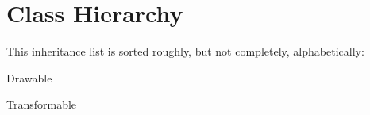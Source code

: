 \section{Class Hierarchy}
This inheritance list is sorted roughly, but not completely, alphabetically\+:\begin{DoxyCompactList}
\item {}
\item Drawable\begin{DoxyCompactList}
\item {}
\item {}
\end{DoxyCompactList}
\item {}
\item {}
\item {}
\item Transformable\begin{DoxyCompactList}
\item {}
\item {}
\end{DoxyCompactList}
\end{DoxyCompactList}
